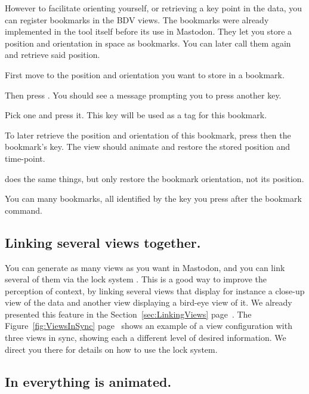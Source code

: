 However to facilitate orienting yourself, or retrieving a key point in the data, you can register bookmarks in the BDV views. 
The bookmarks were already implemented in the \bdv tool itself before its use in Mastodon.
They let you store a position and orientation in space as bookmarks. 
You can later call them again and retrieve said position. 
\begin{myitemize}
    \item First move to the position and orientation you want to store in a bookmark.
    \item Then press . You should see a message prompting you to press another key.
    \item Pick one and press it. This key will be used as a tag for this bookmark.
    \item To later retrieve the position and orientation of this bookmark, press  then the bookmark's key. The view should animate and restore the stored position and time-point.
    \item {} does the same things, but only restore the bookmark orientation, not its position.
\end{myitemize}

You can many bookmarks, all identified by the key you press after the bookmark command.



\subsection{Linking several views together.}

You can generate as many views as you want in Mastodon, and you can link several of them via the lock system .
This is a good way to improve the perception of context, by linking several views that display for instance a close-up view of the data and another view displaying a bird-eye view of it.
We already presented this feature in the Section~\ref{sec:LinkingViews} page~\pageref{sec:LinkingViews}. 
The Figure~\ref{fig:ViewsInSync} page~\pageref{fig:ViewsInSync} shows an example of a view configuration with three views in sync, showing each a different level of desired information.
We direct you there for details on how to use the lock system.


\subsection{In \TrackScheme everything is animated.}

